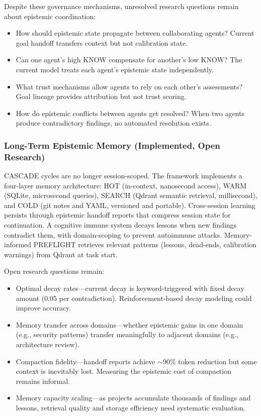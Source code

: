Despite these governance mechanisms, unresolved research questions remain about epistemic coordination:

\begin{itemize}
    \item How should epistemic state propagate between collaborating agents? Current goal handoff transfers context but not calibration state.
    \item Can one agent's high KNOW compensate for another's low KNOW? The current model treats each agent's epistemic state independently.
    \item What trust mechanisms allow agents to rely on each other's assessments? Goal lineage provides attribution but not trust scoring.
    \item How do epistemic conflicts between agents get resolved? When two agents produce contradictory findings, no automated resolution exists.
\end{itemize}

\subsubsection{Long-Term Epistemic Memory (Implemented, Open Research)}

CASCADE cycles are no longer session-scoped. The framework implements a four-layer memory architecture: HOT (in-context, nanosecond access), WARM (SQLite, microsecond queries), SEARCH (Qdrant semantic retrieval, millisecond), and COLD (git notes and YAML, versioned and portable). Cross-session learning persists through epistemic handoff reports that compress session state for continuation. A cognitive immune system decays lessons when new findings contradict them, with domain-scoping to prevent autoimmune attacks. Memory-informed PREFLIGHT retrieves relevant patterns (lessons, dead-ends, calibration warnings) from Qdrant at task start.

Open research questions remain:

\begin{itemize}
    \item Optimal decay rates---current decay is keyword-triggered with fixed decay amount (0.05 per contradiction). Reinforcement-based decay modeling could improve accuracy.
    \item Memory transfer across domains---whether epistemic gains in one domain (e.g., security patterns) transfer meaningfully to adjacent domains (e.g., architecture review).
    \item Compaction fidelity---handoff reports achieve $\sim$90\% token reduction but some context is inevitably lost. Measuring the epistemic cost of compaction remains informal.
    \item Memory capacity scaling---as projects accumulate thousands of findings and lessons, retrieval quality and storage efficiency need systematic evaluation.
\end{itemize}

